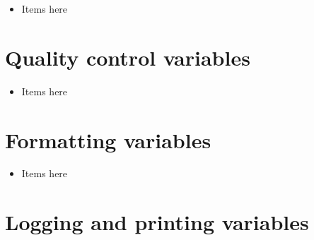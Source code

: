 \begin{itemize}

\item Items here
% 


\end{itemize}


\clearpage
\newpage
\section{Quality control variables}
\label{ch:variables:qualitycontrol}

\begin{itemize}

\item Items here
% 


\end{itemize}


\ifdevguide

\clearpage
\newpage
\section{Formatting variables}
\label{ch:variables:formatting}

\begin{itemize}

\item Items here
% 


\end{itemize}

\fi

\clearpage
\newpage
\section{Logging and printing variables}
\label{ch:variables:log_print}

